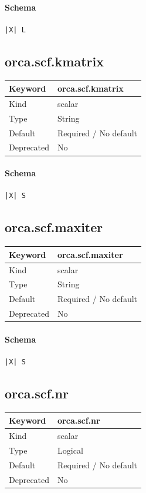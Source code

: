 \documentclass[11pt]{article}
\begin{document}
{{{{{\paragraph{Schema}
\begin{Verbatim}
|X| L
\end{Verbatim}

\subsection{orca.scf.kmatrix}
\label{kw:orca-scf-kmatrix}
\begin{longtable}{|p{1.5in}|p{4.5in}|}
\hline
Keyword & orca.scf.kmatrix \\
\hline
Kind & scalar \\
\hline
Type & String \\
\hline
Default & Required / No default \\
\hline
Deprecated & No \\
\hline
\end{longtable}
\paragraph{Schema}
\begin{Verbatim}
|X| S
\end{Verbatim}

\subsection{orca.scf.maxiter}
\label{kw:orca-scf-maxiter}
\begin{longtable}{|p{1.5in}|p{4.5in}|}
\hline
Keyword & orca.scf.maxiter \\
\hline
Kind & scalar \\
\hline
Type & String \\
\hline
Default & Required / No default \\
\hline
Deprecated & No \\
\hline
\end{longtable}
\paragraph{Schema}
\begin{Verbatim}
|X| S
\end{Verbatim}

\subsection{orca.scf.nr}
\label{kw:orca-scf-nr}
\begin{longtable}{|p{1.5in}|p{4.5in}|}
\hline
Keyword & orca.scf.nr \\
\hline
Kind & scalar \\
\hline
Type & Logical \\
\hline
Default & Required / No default \\
\hline
Deprecated & No \\
\hline
\end{longtable}
}}}}}
\end{document}
